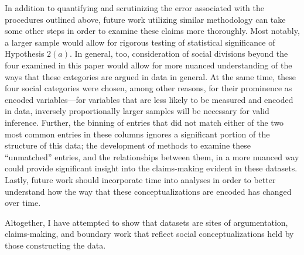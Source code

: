 In addition to quantifying and scrutinizing the error associated with the procedures outlined above, future work utilizing similar methodology can take some other steps in order to examine these claims more thoroughly. Most notably, a larger sample would allow for rigorous testing of statistical significance of Hypothesis $2(a)$. In general, too, consideration of social divisions beyond the four examined in this paper would allow for more nuanced understanding of the ways that these categories are argued in data in general. At the same time, these four social categories were chosen, among other reasons, for their prominence as encoded variables---for variables that are less likely to be measured and encoded in data, inversely proportionally larger samples will be necessary for valid inference. Further, the binning of entries that did not match either of the two most common entries in these columns ignores a significant portion of the structure of this data; the development of methods to examine these ``unmatched'' entries, and the relationships between them, in a more nuanced way could provide significant insight into the claims-making evident in these datasets. Lastly, future work should incorporate time into analyses in order to better understand how the way that these conceptualizations are encoded has changed over time. 

Altogether, I have attempted to show that datasets are sites of argumentation, claims-making, and boundary work that reflect social conceptualizations held by those constructing the data.
